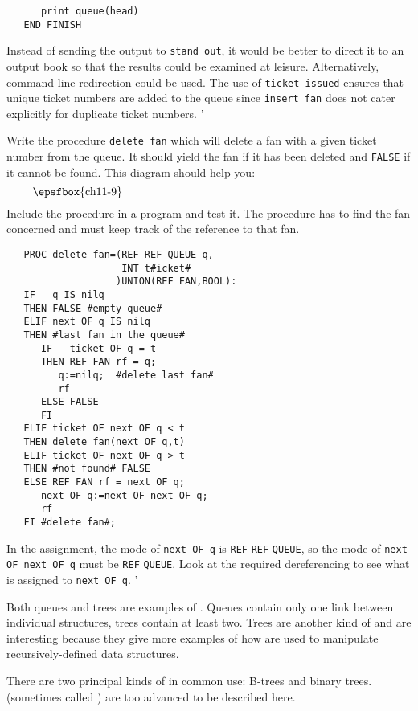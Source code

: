 \begin{exercise}
\begin{verbatim}
      print queue(head)
   END FINISH
\end{verbatim}
\noindent Instead of sending the output to \verb|stand out|, it would be
better to direct it to an output book so that the results could be
examined at leisure.  Alternatively, command line redirection could
be used.  The use of \verb|ticket issued| ensures that unique ticket
numbers are added to the queue since \verb|insert fan| does not cater
explicitly for duplicate ticket numbers.
'
\item Write the procedure \verb|delete fan| which will delete a fan
with a given ticket number from the queue. It should yield the fan if
it has been deleted and \verb|FALSE| if it cannot be found. This
diagram should help you:
$$\vbox{\epsfbox{ch11-9}}$$
Include the procedure in a program and test it. \ans The procedure
has to find the fan concerned and must keep track of the reference to
that fan.
\begin{verbatim}
   PROC delete fan=(REF REF QUEUE q,
                    INT t#icket#
                   )UNION(REF FAN,BOOL):
   IF   q IS nilq
   THEN FALSE #empty queue#
   ELIF next OF q IS nilq
   THEN #last fan in the queue#
      IF   ticket OF q = t
      THEN REF FAN rf = q;
         q:=nilq;  #delete last fan#
         rf
      ELSE FALSE
      FI
   ELIF ticket OF next OF q < t
   THEN delete fan(next OF q,t)
   ELIF ticket OF next OF q > t
   THEN #not found# FALSE
   ELSE REF FAN rf = next OF q;
      next OF q:=next OF next OF q;
      rf
   FI #delete fan#;
\end{verbatim}
\noindent
In the assignment, the mode of \verb|next OF q| is \verb|REF|
\verb|REF| \verb|QUEUE|, so the mode of \verb|next OF next OF q| must
be \verb|REF| \verb|QUEUE|. Look at the required dereferencing to see
what is assigned to \verb|next OF q|.
'
\end{exercise}

Both queues and trees are examples of
. Queues contain only
one link between individual structures, trees contain at least two.
Trees are another kind of  and are
interesting because they give more examples of how
 are used to manipulate
recursively-defined data structures.

There are two principal kinds of  in common use:
B-trees and binary trees.  (sometimes called
) are too advanced to be described here.

